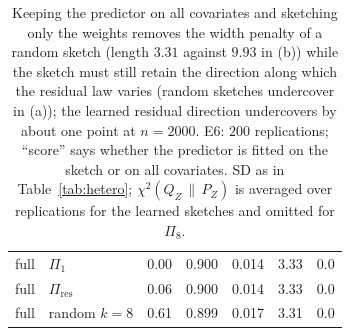 \documentclass[11pt,a4paper]{article}
\newcommand{\chisqZ}{\chi^2(Q_Z\,\|\,P_Z)}
\theoremstyle{plain}
\theoremstyle{definition}
\theoremstyle{remark}
\begin{document}
\begin{table}[!htbp]
\begin{tabular}{llccccc}
full & $\Pi_1$ & 0.00 & 0.900 & 0.014 & 3.33 & 0.0\\
full & $\Pi_{\mathrm{res}}$ & 0.06 & 0.900 & 0.014 & 3.33 & 0.0\\
full & random $k=8$ & 0.61 & 0.899 & 0.017 & 3.31 & 0.0\\
\bottomrule
\end{tabular}
\caption{Keeping the predictor on all covariates and sketching only the weights removes the width penalty of a random sketch (length $3.31$ against $9.93$ in (b)) while the sketch must still retain the direction along which the residual law varies (random sketches undercover in (a)); the learned residual direction undercovers by about one point at $n=2000$. E6: $200$ replications; ``score'' says whether the predictor is fitted on the sketch or on all covariates. SD as in Table~\ref{tab:hetero}; $\chisqZ$ is averaged over replications for the learned sketches and omitted for $\Pi_8$.}\label{tab:fullscore}
\end{table}

\FloatBarrier
\end{document}
